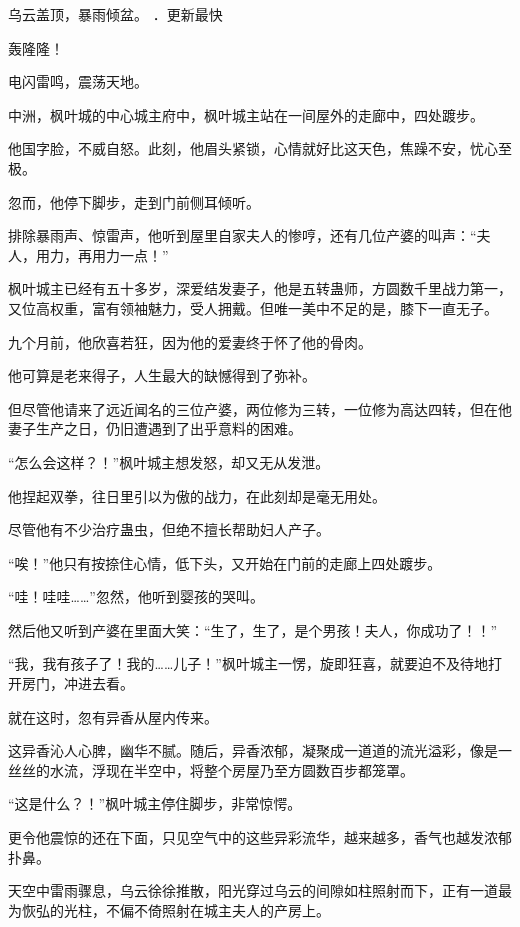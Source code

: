 
\begin{this_body}

乌云盖顶，暴雨倾盆。 ．更新最快

轰隆隆！

电闪雷鸣，震荡天地。

中洲，枫叶城的中心城主府中，枫叶城主站在一间屋外的走廊中，四处踱步。

他国字脸，不威自怒。此刻，他眉头紧锁，心情就好比这天色，焦躁不安，忧心至极。

忽而，他停下脚步，走到门前侧耳倾听。

排除暴雨声、惊雷声，他听到屋里自家夫人的惨哼，还有几位产婆的叫声：“夫人，用力，再用力一点！”

枫叶城主已经有五十多岁，深爱结发妻子，他是五转蛊师，方圆数千里战力第一，又位高权重，富有领袖魅力，受人拥戴。但唯一美中不足的是，膝下一直无子。

九个月前，他欣喜若狂，因为他的爱妻终于怀了他的骨肉。

他可算是老来得子，人生最大的缺憾得到了弥补。

但尽管他请来了远近闻名的三位产婆，两位修为三转，一位修为高达四转，但在他妻子生产之日，仍旧遭遇到了出乎意料的困难。

“怎么会这样？！”枫叶城主想发怒，却又无从发泄。

他捏起双拳，往日里引以为傲的战力，在此刻却是毫无用处。

尽管他有不少治疗蛊虫，但绝不擅长帮助妇人产子。

“唉！”他只有按捺住心情，低下头，又开始在门前的走廊上四处踱步。

“哇！哇哇……”忽然，他听到婴孩的哭叫。

然后他又听到产婆在里面大笑：“生了，生了，是个男孩！夫人，你成功了！！”

“我，我有孩子了！我的……儿子！”枫叶城主一愣，旋即狂喜，就要迫不及待地打开房门，冲进去看。

就在这时，忽有异香从屋内传来。

这异香沁人心脾，幽华不腻。随后，异香浓郁，凝聚成一道道的流光溢彩，像是一丝丝的水流，浮现在半空中，将整个房屋乃至方圆数百步都笼罩。

“这是什么？！”枫叶城主停住脚步，非常惊愕。

更令他震惊的还在下面，只见空气中的这些异彩流华，越来越多，香气也越发浓郁扑鼻。

天空中雷雨骤息，乌云徐徐推散，阳光穿过乌云的间隙如柱照射而下，正有一道最为恢弘的光柱，不偏不倚照射在城主夫人的产房上。


\end{this_body}
